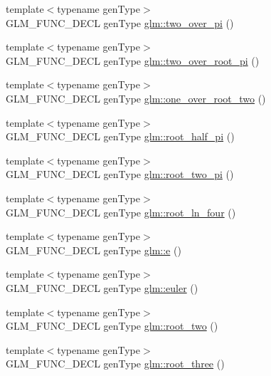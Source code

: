 \begin{CompactItemize}
\item 
{\footnotesize template$<$typename genType$>$ }\\GLM\_\-FUNC\_\-DECL genType \hyperlink{group__gtc__constants_g3b92bf25d756f2d34a531394146decbf}{glm::two\_\-over\_\-pi} ()
\item 
{\footnotesize template$<$typename genType$>$ }\\GLM\_\-FUNC\_\-DECL genType \hyperlink{group__gtc__constants_g542f9a504c7cf25b6c0108adb4a9f97a}{glm::two\_\-over\_\-root\_\-pi} ()
\item 
{\footnotesize template$<$typename genType$>$ }\\GLM\_\-FUNC\_\-DECL genType \hyperlink{group__gtc__constants_g59e3cc61460e0c503d80df6e70aa38b0}{glm::one\_\-over\_\-root\_\-two} ()
\item 
{\footnotesize template$<$typename genType$>$ }\\GLM\_\-FUNC\_\-DECL genType \hyperlink{group__gtc__constants_g39bda21134486f771067238aa263c562}{glm::root\_\-half\_\-pi} ()
\item 
{\footnotesize template$<$typename genType$>$ }\\GLM\_\-FUNC\_\-DECL genType \hyperlink{group__gtc__constants_g030fc8d3f9b605ce3d21dba058c930dd}{glm::root\_\-two\_\-pi} ()
\item 
{\footnotesize template$<$typename genType$>$ }\\GLM\_\-FUNC\_\-DECL genType \hyperlink{group__gtc__constants_g0f121de1b70ce7379c08f47291efdb49}{glm::root\_\-ln\_\-four} ()
\item 
{\footnotesize template$<$typename genType$>$ }\\GLM\_\-FUNC\_\-DECL genType \hyperlink{group__gtc__constants_g2425b9c6a54d9d91fd1a634700e85cf1}{glm::e} ()
\item 
{\footnotesize template$<$typename genType$>$ }\\GLM\_\-FUNC\_\-DECL genType \hyperlink{group__gtc__constants_g99cfc0dd627ebc20b51d3c9c0f706c6a}{glm::euler} ()
\item 
{\footnotesize template$<$typename genType$>$ }\\GLM\_\-FUNC\_\-DECL genType \hyperlink{group__gtc__constants_g7e985cdcc68d42d833072d09cac683dc}{glm::root\_\-two} ()
\item 
{\footnotesize template$<$typename genType$>$ }\\GLM\_\-FUNC\_\-DECL genType \hyperlink{group__gtc__constants_g2d2fec6ccd7b739e797e402521780fe3}{glm::root\_\-three} ()
\item 

\end{CompactItemize}
